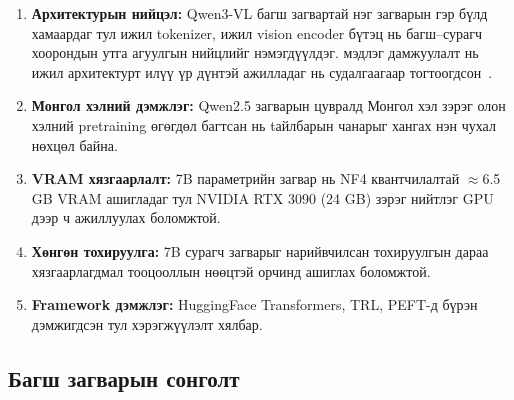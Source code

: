 \begin{enumerate}
    \item \textbf{Архитектурын нийцэл:} Qwen3-VL багш загвартай нэг загварын гэр бүлд хамаардаг тул ижил tokenizer, ижил vision encoder бүтэц нь багш--сурагч хоорондын утга агуулгын нийцлийг нэмэгдүүлдэг. мэдлэг дамжуулалт нь ижил архитектурт илүү үр дүнтэй ажилладаг нь судалгаагаар тогтоогдсон~\cite{hinton2015distilling}.

    \item \textbf{Монгол хэлний дэмжлэг:} Qwen2.5 загварын цувралд Монгол хэл зэрэг олон хэлний pretraining өгөгдөл багтсан нь tайлбарын чанарыг хангах нэн чухал нөхцөл байна.

    \item \textbf{VRAM хязгаарлалт:} 7B параметрийн загвар нь NF4 квантчилалтай $\approx$6.5 GB VRAM ашигладаг тул NVIDIA RTX 3090 (24 GB) зэрэг нийтлэг GPU дээр ч ажиллуулах боломжтой.

    \item \textbf{Хөнгөн тохируулга:} 7B сурагч загварыг нарийвчилсан тохируулгын дараа хязгаарлагдмал тооцооллын нөөцтэй орчинд ашиглах боломжтой.

    \item \textbf{Framework дэмжлэг:} HuggingFace Transformers, TRL, PEFT-д бүрэн дэмжигдсэн тул хэрэгжүүлэлт хялбар.
\end{enumerate}

\begin{table}[htbp]
\centering
\caption{Сурагч загварын сонголтын харьцуулалт}
\label{tab:student_comparison}
\end{table}

\subsection{Багш загварын сонголт}

